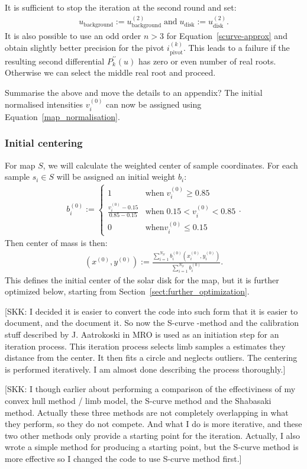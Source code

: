 \documentclass{aa}
\newcommand{\fg}[1]{\textcolor{midblue}{#1}}
\newcommand{\skk}[1]{\textcolor{midorange}{[SKK: #1]}} %
\newcommand{\eqnl}[2]{\begin{eqnarray}\label{#1}#2\end{eqnarray}}
\newcommand{\s}[2]{{#1}_{\mathrm{#2}}}
\begin{document}
  It is sufficient to stop the iteration at the second round and set:
  \eqnl{scurve-converged}{
  \s{u}{background} := \s{u}{background}^{(2)} \; \text{and} \; \s{u}{disk} := \s{u}{disk}^{(2)} \text{.}
  }
  It is also possible to use an odd order $n > 3$ for Equation~\ref{scurve-approx} and obtain slightly better precision 
  for the pivot $\s{i}{pivot}^{(k)}$. This leads to a failure if the resulting second differential $P_k^{\prime\prime}(u)$ 
  has zero or even number of real roots. Otherwise we can select the middle real root and proceed.

  \fg{Summarise the above and move the details to an appendix?}
  The initial normalised intensities $v_i^{(0)}$ can now be assigned using Equation~\ref{map_normalisation}.
  
  \subsubsection{Initial centering}\label{sect:initial-centering}

  For map $S$, we will calculate the weighted center of sample coordinates. For each sample $s_i \in S$ will be assigned an initial weight $b_i$:
  \eqnl{centering-initial-weight}{
  b_i^{(0)} := \begin{cases} 1 & \text{when}\; v_i^{(0)} \ge 0.85 \\ \frac{v_i^{(0)} - 0.15}{0.85 - 0.15} & \text{when}\; 0.15 < v_i^{(0)} < 0.85 \\ 0 & \text{when} v_i^{(0)} \le 0.15 \end{cases} \text{.}
  }
  Then center of mass is then:
  \eqnl{centering-center-of-mass}{
  \left( x^{(0)}, y^{(0)} \right) := \frac{\sum \limits_{i=1}^{N_S} b_i^{(0)} \left( x_i^{(0)}, y_i^{(0)} \right)}{\sum \limits_{i=1}^{N_S} b_i^{(0)}} \text{.}
  }
  This defines the initial center of the solar disk for the map, but it is further optimized below, starting from Section~\ref{sect:further_optimization}.

    \skk{I decided it is easier to convert the code into such form that it is easier to document, and the document it. 
    So now the S-curve -method and the calibration stuff described by J. Aatrokoski in MRO is used as an initiation step 
    for an iteration process. This iteration process selects limb samples a estimates they distance from the center. It 
    then fits a circle and neglects outliers. The centering is performed iteratively. I am almost done describing the 
    process thoroughly.}

    \skk{I though earlier about performing a comparison of the effectiviness of my convex hull method / limb model, the 
    S-curve method and the Shabasaki method. Actually these three methods are not completely overlapping in what they 
    perform, so they do not compete. And what I do is more iterative, and these two other methods only provide a 
    starting point for the iteration. Actually, I also wrote a simple method for producing a starting point, but the 
    S-curve method is more effective so I changed the code to use S-curve method first.}
\end{document}
